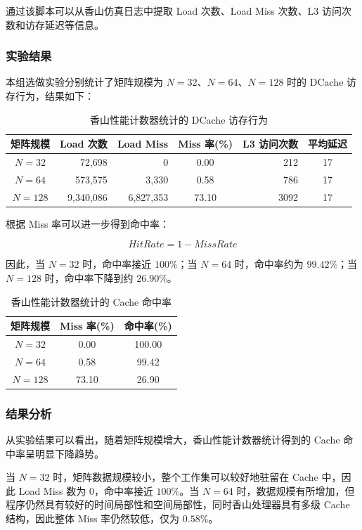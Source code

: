 通过该脚本可以从香山仿真日志中提取 Load 次数、Load Miss 次数、L3 访问次数和访存延迟等信息。

\subsubsection{实验结果}

本组选做实验分别统计了矩阵规模为 $N=32$、$N=64$、$N=128$ 时的 DCache 访存行为，结果如下：

\begin{table}[H]
\centering
\caption{香山性能计数器统计的 DCache 访存行为}
\begin{tabular}{c|r|r|c|r|c}
\hline
矩阵规模 & Load 次数 & Load Miss & Miss 率(\%) & L3 访问次数 & 平均延迟 \\
\hline
$N=32$  & 72,698    & 0         & 0.00  & 212  & 17 \\
$N=64$  & 573,575   & 3,330     & 0.58  & 786  & 17 \\
$N=128$ & 9,340,086 & 6,827,353 & 73.10 & 3092 & 17 \\
\hline
\end{tabular}
\end{table}

根据 Miss 率可以进一步得到命中率：

\[
HitRate = 1 - MissRate
\]

因此，当 $N=32$ 时，命中率接近 $100\%$；当 $N=64$ 时，命中率约为 $99.42\%$；当 $N=128$ 时，命中率下降到约 $26.90\%$。

\begin{table}[H]
\centering
\caption{香山性能计数器统计的 Cache 命中率}
\begin{tabular}{c|c|c}
\hline
矩阵规模 & Miss 率(\%) & 命中率(\%) \\
\hline
$N=32$  & 0.00  & 100.00 \\
$N=64$  & 0.58  & 99.42 \\
$N=128$ & 73.10 & 26.90 \\
\hline
\end{tabular}
\end{table}

\subsubsection{结果分析}

从实验结果可以看出，随着矩阵规模增大，香山性能计数器统计得到的 Cache 命中率呈明显下降趋势。

当 $N=32$ 时，矩阵数据规模较小，整个工作集可以较好地驻留在 Cache 中，因此 Load Miss 数为 0，命中率接近 $100\%$。当 $N=64$ 时，数据规模有所增加，但程序仍然具有较好的时间局部性和空间局部性，同时香山处理器具有多级 Cache 结构，因此整体 Miss 率仍然较低，仅为 $0.58\%$。

